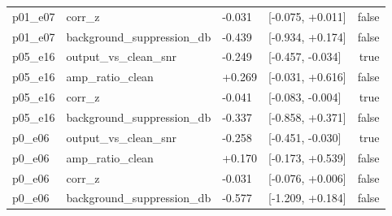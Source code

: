 \begin{tabular}{llllr}
p01\_e07 & corr\_z & -0.031 & [-0.075, +0.011] & false \\
p01\_e07 & background\_suppression\_db & -0.439 & [-0.934, +0.174] & false \\
p05\_e16 & output\_vs\_clean\_snr & -0.249 & [-0.457, -0.034] & true \\
p05\_e16 & amp\_ratio\_clean & +0.269 & [-0.031, +0.616] & false \\
p05\_e16 & corr\_z & -0.041 & [-0.083, -0.004] & true \\
p05\_e16 & background\_suppression\_db & -0.337 & [-0.858, +0.371] & false \\
p0\_e06 & output\_vs\_clean\_snr & -0.258 & [-0.451, -0.030] & true \\
p0\_e06 & amp\_ratio\_clean & +0.170 & [-0.173, +0.539] & false \\
p0\_e06 & corr\_z & -0.031 & [-0.076, +0.006] & false \\
p0\_e06 & background\_suppression\_db & -0.577 & [-1.209, +0.184] & false \\
\bottomrule
\end{tabular}
